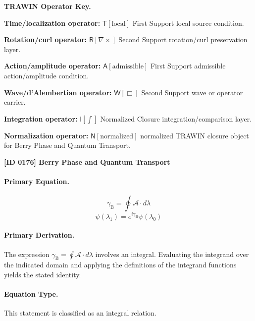\par\vspace{0.45\baselineskip}
\noindent\begin{minipage}[t]{\linewidth}
\begingroup
\small
\raggedright
\textbf{TRAWIN Operator Key.}\par
\noindent\textbf{Time/localization operator:} $\mathsf{T}\!\left[\mathrm{local}\right]$ First Support local source condition.\par
\noindent\textbf{Rotation/curl operator:} $\mathsf{R}\!\left[\nabla\times\right]$ Second Support rotation/curl preservation layer.\par
\noindent\textbf{Action/amplitude operator:} $\mathsf{A}\!\left[\mathrm{admissible}\right]$ First Support admissible action/amplitude condition.\par
\noindent\textbf{Wave/d'Alembertian operator:} $\mathsf{W}\!\left[\Box\right]$ Second Support wave or operator carrier.\par
\noindent\textbf{Integration operator:} $\mathsf{I}\!\left[\int\right]$ Normalized Closure integration/comparison layer.\par
\noindent\textbf{Normalization operator:} $\mathsf{N}\!\left[\mathrm{normalized}\right]$ normalized TRAWIN closure object for Berry Phase and Quantum Transport.\par
\endgroup
\end{minipage}

\clearpage
\noindent\textbf{[ID 0176] Berry Phase and Quantum Transport}\par
\vspace{0.35em}
\paragraph{Primary Equation.}
\[
\gamma_{\mathrm{B}} = \oint \mathcal{A}\cdot d\lambda
\]
\[
\psi(\lambda_1)=e^{i\gamma_{\mathrm{B}}}\psi(\lambda_0)
\]

\paragraph{Primary Derivation.}
The expression \( \gamma_{\mathrm{B}} = \oint \mathcal{A}\cdot d\lambda \) involves an integral. Evaluating the integrand over the indicated domain and applying the definitions of the integrand functions yields the stated identity.
\paragraph{Equation Type.}
This statement is classified as an integral relation.

